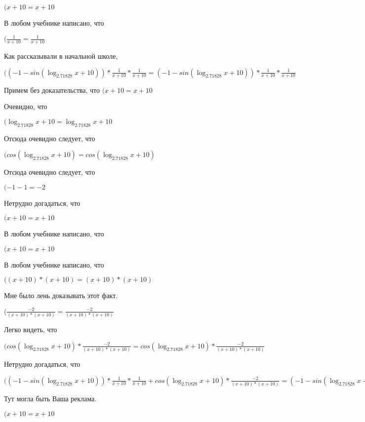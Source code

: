\documentclass[12pt,a4paper,fleqn]{article}
\theoremstyle{definition}
\begin{document}
$( x  +  10  =  x  +  10 $

В любом учебнике написано, что

$(\frac{ 1 }{ x  +  10 }
 = \frac{ 1 }{ x  +  10 }
$

Как рассказывали в начальной школе,

$(( -1  - sin(\log_{ 2.71828 }{ x  +  10 })) * \frac{ 1 }{ x  +  10 }
 * \frac{ 1 }{ x  +  10 }
 = ( -1  - sin(\log_{ 2.71828 }{ x  +  10 })) * \frac{ 1 }{ x  +  10 }
 * \frac{ 1 }{ x  +  10 }
$

Примем без доказательства, что
$( x  +  10  =  x  +  10 $

Очевидно, что

$(\log_{ 2.71828 }{ x  +  10 } = \log_{ 2.71828 }{ x  +  10 }$

Отсюда очевидно следует, что

$(cos(\log_{ 2.71828 }{ x  +  10 }) = cos(\log_{ 2.71828 }{ x  +  10 })$

Отсюда очевидно следует, что

$( -1  -  1  =  -2 $

Нетрудно догадаться, что

$( x  +  10  =  x  +  10 $

В любом учебнике написано, что

$( x  +  10  =  x  +  10 $

В любом учебнике написано, что

$(( x  +  10 ) * ( x  +  10 ) = ( x  +  10 ) * ( x  +  10 )$

Мне было лень доказывать этот факт.

$(\frac{ -2 }{( x  +  10 ) * ( x  +  10 )}
 = \frac{ -2 }{( x  +  10 ) * ( x  +  10 )}
$

Легко видеть, что

$(cos(\log_{ 2.71828 }{ x  +  10 }) * \frac{ -2 }{( x  +  10 ) * ( x  +  10 )}
 = cos(\log_{ 2.71828 }{ x  +  10 }) * \frac{ -2 }{( x  +  10 ) * ( x  +  10 )}
$

Нетрудно догадаться, что

$(( -1  - sin(\log_{ 2.71828 }{ x  +  10 })) * \frac{ 1 }{ x  +  10 }
 * \frac{ 1 }{ x  +  10 }
 + cos(\log_{ 2.71828 }{ x  +  10 }) * \frac{ -2 }{( x  +  10 ) * ( x  +  10 )}
 = ( -1  - sin(\log_{ 2.71828 }{ x  +  10 })) * \frac{ 1 }{ x  +  10 }
 * \frac{ 1 }{ x  +  10 }
 + cos(\log_{ 2.71828 }{ x  +  10 }) * \frac{ -2 }{( x  +  10 ) * ( x  +  10 )}
$

Тут могла быть Ваша реклама.

$( x  +  10  =  x  +  10 $
\end{document}
